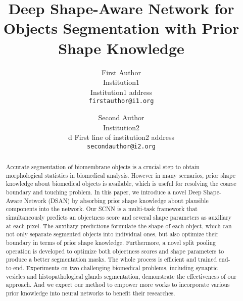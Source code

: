 \documentclass[10pt,twocolumn,letterpaper]{article}
\begin{document}
\title{Deep Shape-Aware Network for Objects Segmentation with Prior Shape Knowledge}

\author{First Author\\
Institution1\\
Institution1 address\\
{\tt\small firstauthor@i1.org}
\and
Second Author\\
Institution2\\d
First line of institution2 address\\
{\tt\small secondauthor@i2.org}
}

\maketitle


\begin{abstract}
   Accurate segmentation of biomembrane objects is a crucial step to obtain morphological statistics in biomedical analysis.
   However in many scenarios, prior shape knowledge about biomedical objects is available, which is useful for resolving the coarse boundary and touching problem.
   In this paper, we introduce a novel Deep Shape-Aware Network (DSAN) by absorbing prior shape knowledge about plausible components into the network.
   Our SCNN is a multi-task framework that simultaneously predicts an objectness score and several shape parameters as auxiliary at each pixel.
   The auxiliary predictions formulate the shape of each object, which can not only separate segmented objects into individual ones, but also optimize their boundary in terms of prior shape knowledge.
   Furthermore, a novel split pooling operation is developed to optimize both objectness scores and shape parameters to produce a better segmentation masks.
   The whole process is efficient and trained end-to-end.
   Experiments on two challenging biomedical problems, including synaptic vesicles and histopathological glands segmentation, demonstrate the effectiveness of our approach.
   And we expect our method to empower more works to incorporate various prior knowledge into neural networks to benefit their researches.

\end{abstract}
\end{document}
